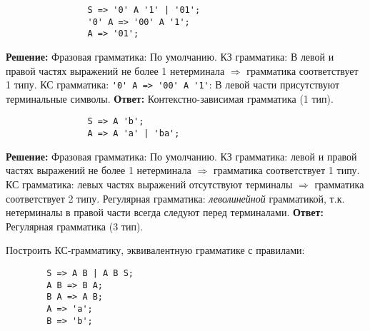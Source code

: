\documentclass[]{article}
\begin{document}
\begin{enumerate}
\begin{item}
\begin{enumerate}
        \begin{item}
            \begin{lstlisting}
                S => '0' A '1' | '01';
                '0' A => '00' A '1';
                A => '01';
            \end{lstlisting}
            \bigbreak
            \textbf{Решение:}
            \smallbreak
            Фразовая грамматика:
            \hfill\break По умолчанию.
            \smallbreak
            КЗ грамматика:
            \hfill\break В левой и правой частях выражений не более 1 нетерминала $\Rightarrow$ грамматика соответствует 1 типу.
            \smallbreak
            КС грамматика:
            \hfill\break \lstinline|'0' A => '00' A '1'|: В левой части присутствуют терминальные символы.
            \bigbreak
            \textbf{Ответ:}
            Контекстно-зависимая грамматика (1 тип).
        \end{item}

        \begin{item}
            \begin{lstlisting}
                S => A 'b';
                A => A 'a' | 'ba';
            \end{lstlisting}
            \bigbreak
            \textbf{Решение:}
            \smallbreak
            Фразовая грамматика:
            \hfill\break По умолчанию.
            \smallbreak
            КЗ грамматика:
            \hfill{} левой и правой частях выражений не более 1 нетерминала $\Rightarrow$ грамматика соответствует 1 типу.
            \smallbreak
            КС грамматика:
            \hfill{} левых частях выражений отсутствуют терминалы $\Rightarrow$ грамматика соответствует 2 типу.
            \smallbreak
            Регулярная грамматика:
            \hfill{} \emph{леволинейной} грамматикой, т.к. нетерминалы в правой части всегда следуют перед терминалами.
            \bigbreak
            \textbf{Ответ:}
            Регулярная грамматика (3 тип).
        \end{item}

    \end{enumerate}
\end{item}

\begin{item}
    Построить КС-грамматику, эквивалентную грамматике с правилами:
    \begin{lstlisting}
        S => A B | A B S;
        A B => B A;
        B A => A B;
        A => 'a';
        B => 'b';
    \end{lstlisting}


\end{item}
\end{enumerate}
\end{document}
